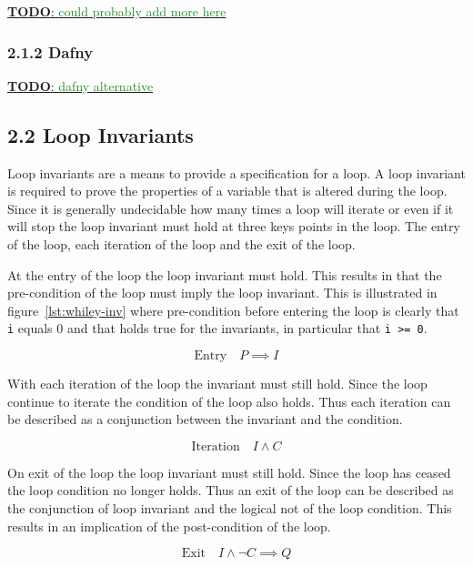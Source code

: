 \documentclass[11pt, a4paper, twoside, openright]{report}
\newcommand{\code}[1]{\texttt{#1}}
\newcommand{\todo}[1]{\huge{\underline{\textbf{\textcolor{RubineRed}{TODO}}: \textcolor{ForestGreen}{#1}}}\normalsize }
\begin{document}
\todo{could probably add more here}

\cite{whiley-design}
\cite{whiley-arrays}

\subsubsection*{2.1.2 Dafny}
\todo{dafny alternative}
\cite{dafny-started}
\cite{dafny-lang}


\subsection*{2.2 Loop Invariants}
%

Loop invariants are a means to provide a specification for a loop.
A loop invariant is required to prove the properties of a variable
that is altered during the loop.
Since it is generally undecidable how many times a loop
will iterate or even if it will stop %
the loop invariant must hold at three keys points in the loop.
The entry of the loop, each iteration of the loop and the exit of the
loop.

At the entry of the loop the loop invariant must hold.
This results in that the pre-condition of the loop must imply
the loop invariant.
This is illustrated in figure~\ref{lst:whiley-inv} where pre-condition
before entering the loop is clearly that \code{i} equals 0 and that holds
true for the invariants, in particular that \code{i >= 0}.

$$\text{Entry} \quad P \implies I$$

With each iteration of the loop the invariant must still hold.
Since the loop continue to iterate the condition of the loop
also holds. Thus each iteration can be described as a conjunction
between the invariant and the condition.

$$\text{Iteration} \quad I \wedge C $$

On exit of the loop the loop invariant must still hold.
Since the loop has ceased the loop condition no longer
holds. Thus an exit of the loop can be described
as the conjunction of loop invariant and the logical
not of the loop condition.
This results in an implication of the post-condition of the
loop.

$$\text{Exit} \quad I \wedge \neg{C} \implies Q$$
\end{document}
